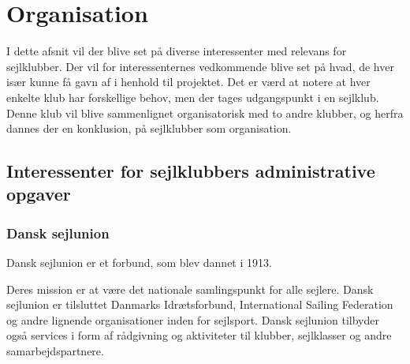 \chapter{Organisation}\label{chap:organisation}


I dette afsnit vil der blive set på diverse interessenter med relevans for sejlklubber. Der vil for interessenternes
vedkommende blive set på hvad, de hver især kunne få gavn af i henhold til projektet. Det er værd at notere at hver
enkelte klub har forskellige behov, men der tages udgangspunkt i en sejlklub. Denne klub vil blive sammenlignet organisatorisk med to andre klubber, og herfra dannes der en konklusion, på sejlklubber som organisation.

\section{Interessenter for sejlklubbers administrative opgaver}

\subsection{Dansk sejlunion}

Dansk sejlunion er et forbund, som blev dannet i 1913.

Deres mission er at være det nationale samlingspunkt for alle sejlere. Dansk sejlunion er tilsluttet Danmarks
Idrætsforbund, International Sailing Federation og andre lignende organisationer inden for sejlsport. Dansk
sejlunion tilbyder også services i form af rådgivning og aktiviteter til klubber, sejlklasser og andre
samarbejdspartnere.


%


